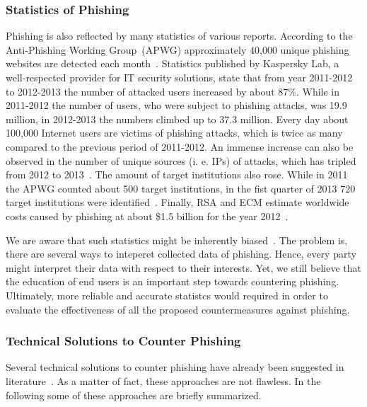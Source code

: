 \subsubsection{Statistics of Phishing}
\label{s:stats}
Phishing is also reflected by many statistics of various reports.
 According to the Anti-Phishing Working Group~(APWG) approximately 40,000 unique phishing websites are detected each month~\cite{antiphishingtrendreport2013}. Statistics published by Kaspersky Lab, a well-respected provider for IT security solutions, state that from year 2011-2012 to 2012-2013 the number of attacked users increased by about 87\%. While in 2011-2012 the number of users, who were subject to phishing attacks, was 19.9 million, in 2012-2013 the numbers climbed up to 37.3 million.
 Every day about 100,000 Internet users are victims of phishing attacks, which is twice as many compared to the previous period of 2011-2012. An immense increase can also be observed in the number of unique sources (i.
e.
 IPs) of attacks, which has tripled from 2012 to 2013~\cite{kasperskyreport2013}. The amount of target institutions also rose.
 While in 2011 the APWG counted about 500 target institutions, in the fist quarter of 2013 720 target institutions were identified~\cite{antiphishingglobalreport2013}. 
Finally, RSA and ECM estimate worldwide costs caused by phishing at about \$1.5 billion for the year 2012~\cite{rsa2013}.

We are aware that such statistics might be inherently biased~\cite{moore2010hard}. 
The problem is, there are several ways to inteperet collected data of phishing.
Hence, every party might interpret their data with respect to their interests.
Yet, we still believe that the education of end users is an important step towards countering phishing. 
Ultimately, more reliable and accurate statistcs would required in order to evaluate the effectiveness of all the proposed countermeasures against phishing.

\subsubsection{Technical Solutions to Counter Phishing}

Several technical solutions to counter phishing have already been suggested in literature~\cite{purkait2012phishing}. 
As a matter of fact, these approaches are not flawless. 
In the following some of these approaches are briefly summarized.

